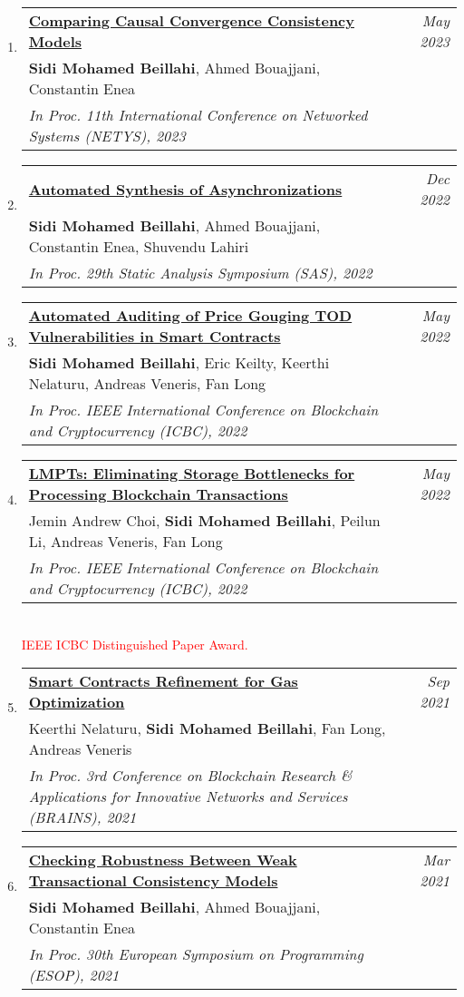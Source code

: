 \documentclass[10pt]{article}
\makeatletter
\newcommand{\lbar}[1]{{\color{#1}\ding{118}}\hspace*{2pt}}
\newenvironment{benumerate}[2]{
    \let\oldItem\item
    \def\item{\addtocounter{enumi}{-2}\oldItem}
    \begin{enumerate}[#2] \itemsep3pt
    \setcounter{enumi}{#1}
    \addtocounter{enumi}{1}}
  {\end{enumerate}}
\newenvironment{publication}[5]
{ \item
  \begin{tabular*}{7.5in}{p{6.3in}@{\extracolsep{\fill}}r}
    \href{#1}{\textbf{#2}} & \textit{#3}\\ #4 &\\ \textit{#5}&\\
  \end{tabular*}
} {}
\newenvironment{region}[3]{%
  \vspace*{0.5ex}
  {\scalebox{1.4}{\textbf{#1}}}
  \begin{benumerate}{#3}{\color{RoyalBlue}#2}}
  {\end{benumerate}\vspace{0.8ex}}
\makeatother
\begin{document}
\begin{region} {\lbar{purple}Conference Publications}{{C}1}{17}
  \begin{publication} {https://beillahi.github.io}
		{Comparing Causal Convergence Consistency Models}
		{May 2023} {\textbf{Sidi Mohamed Beillahi}, Ahmed Bouajjani, Constantin Enea}
		{In Proc. 11th International Conference on Networked Systems (NETYS), 2023}
  \end{publication}

  \begin{publication} {https://beillahi.github.io/papers/async.pdf}
		{Automated Synthesis of Asynchronizations}
		{Dec 2022} {\textbf{Sidi Mohamed Beillahi}, Ahmed Bouajjani, Constantin Enea, Shuvendu Lahiri}
		{In Proc. 29th Static Analysis Symposium (SAS), 2022}
  \end{publication}

  \begin{publication} {https://beillahi.github.io/papers/2022040426.pdf}
		{Automated Auditing of Price Gouging TOD Vulnerabilities in Smart Contracts}
		{May 2022} {\textbf{Sidi Mohamed Beillahi}, Eric Keilty, Keerthi Nelaturu, Andreas Veneris, Fan Long}
		{In Proc. IEEE International Conference on Blockchain and Cryptocurrency (ICBC), 2022}
  \end{publication}

  \begin{publication} {https://beillahi.github.io/papers/2022044041.pdf}
		{LMPTs: Eliminating Storage Bottlenecks for Processing Blockchain Transactions}
		{May 2022} {Jemin Andrew Choi, \textbf{Sidi Mohamed Beillahi}, Peilun Li, Andreas Veneris, Fan Long}
		{In Proc. IEEE International Conference on Blockchain and Cryptocurrency (ICBC), 2022}
    {\\ \textcolor{red}{IEEE ICBC Distinguished Paper Award.}}
  \end{publication}

  \begin{publication} {https://beillahi.github.io/papers/BRAINS21.pdf}
		{Smart Contracts Refinement for Gas Optimization}
		{Sep 2021} {Keerthi Nelaturu, \textbf{Sidi Mohamed Beillahi}, Fan Long, Andreas Veneris}
		{In Proc. 3rd Conference on Blockchain Research \& Applications for Innovative Networks and Services (BRAINS), 2021}
  \end{publication}

  \begin{publication} {https://beillahi.github.io/papers/ESOP21.pdf}
		{Checking Robustness Between Weak Transactional Consistency Models}
		{Mar 2021} {\textbf{Sidi Mohamed Beillahi}, Ahmed Bouajjani, Constantin Enea} 
		{In Proc. 30th European Symposium on Programming (ESOP), 2021} 
  \end{publication}


\end{region}
\end{document}

